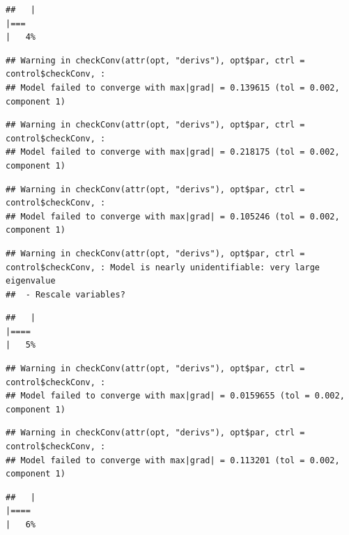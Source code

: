\documentclass[
  12pt,
]{book}
\begin{document}
\begin{verbatim}
##   |                                                                              |===                                                                   |   4%
\end{verbatim}

\begin{verbatim}
## Warning in checkConv(attr(opt, "derivs"), opt$par, ctrl = control$checkConv, :
## Model failed to converge with max|grad| = 0.139615 (tol = 0.002, component 1)
\end{verbatim}

\begin{verbatim}
## Warning in checkConv(attr(opt, "derivs"), opt$par, ctrl = control$checkConv, :
## Model failed to converge with max|grad| = 0.218175 (tol = 0.002, component 1)
\end{verbatim}

\begin{verbatim}
## Warning in checkConv(attr(opt, "derivs"), opt$par, ctrl = control$checkConv, :
## Model failed to converge with max|grad| = 0.105246 (tol = 0.002, component 1)
\end{verbatim}

\begin{verbatim}
## Warning in checkConv(attr(opt, "derivs"), opt$par, ctrl = control$checkConv, : Model is nearly unidentifiable: very large eigenvalue
##  - Rescale variables?
\end{verbatim}

\begin{verbatim}
##   |                                                                              |====                                                                  |   5%
\end{verbatim}

\begin{verbatim}
## Warning in checkConv(attr(opt, "derivs"), opt$par, ctrl = control$checkConv, :
## Model failed to converge with max|grad| = 0.0159655 (tol = 0.002, component 1)
\end{verbatim}

\begin{verbatim}
## Warning in checkConv(attr(opt, "derivs"), opt$par, ctrl = control$checkConv, :
## Model failed to converge with max|grad| = 0.113201 (tol = 0.002, component 1)
\end{verbatim}

\begin{verbatim}
##   |                                                                              |====                                                                  |   6%
\end{verbatim}
\end{document}
